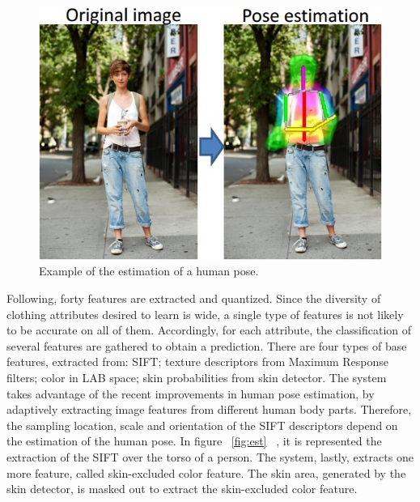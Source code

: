 \documentclass[titlepage,12pt,a4paper,times]{book}
\begin{document}
\begin{figure}[!h]
\centering
\includegraphics[scale=0.9]{images/2_3_fig1.jpg}
\caption{Example of the estimation of a human pose.}
\label{fig:eehp}
\end{figure}
\FloatBarrier

Following, forty features are extracted and quantized. Since the diversity of
clothing attributes desired to learn is wide, a single type of features is
not likely to be accurate on all of them. Accordingly, for each attribute, the
classification of several features are gathered to obtain a prediction. There
are four types of base features, extracted from: \ac{SIFT}; texture descriptors
from Maximum Response filters; color in LAB space; skin probabilities from skin
detector. The system takes advantage of the recent improvements in human pose
estimation, by adaptively extracting image features from different human body
parts. Therefore, the sampling location, scale and orientation of the \ac{SIFT}
descriptors depend on the estimation of the human pose. In figure ~\ref{fig:est}
~\citep{2}, it is represented the extraction of the \ac{SIFT} over the torso of
a person. The system, lastly, extracts one more feature, called skin-excluded
color feature. The skin area, generated by the skin detector, is masked out
to extract the skin-excluded color feature.
\end{document}
